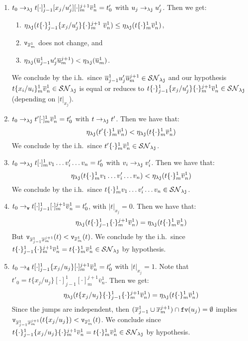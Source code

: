 \documentclass{LMCS}
\renewcommand{\>}{\rightarrow}
\def\lam{\lambda}
\newcommand{\Rew}[1]{\rightarrow_{#1}}
\newcommand{\isubs}[1]{ \{ #1  \} }
\newcommand{\SN}[1]{\mathcal{SN}_{#1}}
\newcommand{\ttv}{{\tt v}}
\newcommand{\dis}{{\tt j}}
\newcommand{\ldis}{\lam{\dis}}
\newcommand{\fv}[1]{{\tt fv}(#1)}
\newcommand{\Var}{{\tt d}}
\newcommand{\Gc}{{\tt w}}
\newcommand{\ems}{\emptyset}
\newcommand{\ih}{i.h.}
\newcommand{\fo}[2]{\ttv_{#2}(#1)}
\newcommand{\fop}[1]{\ttv_{#1}}
\renewcommand{\sp}[4]{\{#1_{i}/#2_{i}\}^{#3}_{#4}}
\newcommand{\ovl}[3]{\overline{#1}^{#2}_{#3}}
\newcommand{\jump}{jump}
\newcommand{\espp}[4]{[\cdot]^{#3}_{#4}}
\newcommand{\spp}[4]{\{\cdot\}^{#3}_{#4}}
\begin{document}
\begin{enumerate}[$\bullet$]
\item $t_0 \Rew{\ldis} t\espp{x}{u}{1}{j-1} [x_j/u'_j] \espp{x}{u}{j+1}{m} \ovl{v}{1}{n}= t'_0$ with $u_j \Rew{\ldis} u'_j$.  Then we get:
  \begin{enumerate}[$-$]
\item $\eta_{\ldis}(t\spp{x}{u}{1}{j-1}\isubs{x_j/u'_j}\spp{x}{u}{j+1}{m}\
 \ovl{v}{1}{n}) \leq \eta_{\ldis}(t\spp{x}{u}{1}{m} \ovl{v}{1}{n})$,
 \item $\fop{\ovl{x}{1}{m}}$ does not change, and
 \item $\eta_{\ldis}(\ovl{u}{1}{j-1} u'_j \ovl{u}{j+1}{m}) < \eta_{\ldis}(\ovl{u}{1}{m})$.
 \end{enumerate}
We conclude by the \ih\  since $\ovl{u}{1}{j-1} u'_j \ovl{u}{j+1}{m} \in \SN{\ldis}$ and  our hypothesis $t\sp{x}{u}{1}{m}\ovl{v}{1}{n}\in \SN{\ldis}$ is equal or reduces to $t\spp{x}{u}{1}{j-1}\isubs{x_j/u'_j}\spp{x}{u}{j+1}{m}\ovl{v}{1}{n} \in \SN{\ldis}$ (depending on $|t|_{x_j}$).


\item $t_0  \Rew{\ldis} t' \espp{x}{u}{1}{m} \ovl{v}{1}{n}= t'_0$ with $t \Rew{\ldis}
  t'$. Then we have that:
$$\eta_{\ldis}(t'\spp{x}{u}{1}{m} \ovl{v}{1}{n}) < 
\eta_{\ldis}(t\spp{x}{u}{1}{m} \ovl{v}{1}{n})$$
We conclude by the \ih\ since 
  $t'\spp{x}{u}{1}{m} \ovl{v}{1}{n} \in \SN{\ldis}$.


\item $t_0  \Rew{\ldis} t \espp{x}{u}{1}{m} v_1 \ldots  v'_i \ldots  v_n= t'_0$ with $v_i \Rew{\ldis}
  v'_i$.
 Then we have that:
$$\eta_{\ldis}(t\spp{x}{u}{1}{m} v_1 \ldots  v'_i \ldots  v_n) < 
\eta_{\ldis}(t\spp{x}{u}{1}{m} \ovl{v}{1}{n})$$
We conclude by the \ih\ since 
  $t\spp{x}{u}{1}{m} v_1 \ldots  v'_i \ldots  v_n \in \SN{\ldis}$.


\item $t_0 \Rew{\Gc} t\espp{x}{u}{1}{j-1} \espp{x}{u}{j+1}{m} \ovl{v}{1}{n}= t'_0$, with $|t|_{x_j}= 0$. Then we have that:
$$\eta_{\ldis}(t\spp{x}{u}{1}{j-1} \spp{x}{u}{j+1}{m} \ovl{v}{1}{n} )=
\eta_{\ldis}(t\spp{x}{u}{1}{m} \ovl{v}{1}{n})$$
But $\fo{t}{\ovl{x}{1}{j-1}\ovl{x}{j+1}{m}} <  \fo{t}{\ovl{x}{1}{m}}$.
We conclude by the \ih\ since 
$t\spp{x}{u}{1}{j-1}\spp{x}{u}{j+1}{m} \ovl{v}{1}{n} =  t\spp{x}{u}{1}{m} \ovl{v}{1}{n} \in \SN{\ldis}$
by hypothesis.

\item $t_0 \Rew{\Var} t  \espp{x}{u}{1}{j-1} \isubs{x_j/u_j} \espp{x}{u}{j+1}{m} \ovl{v}{1}{n} = t'_0$
with $|t|_{x_j} = 1$. Note that $t'_0= t \isubs{x_j/u_j}  \espp{x}{u}{1}{j-1} \espp{x}{u}{j+1}{m} \ovl{v}{1}{n}$.  Then we get:
$$\eta_{\ldis}(t\isubs{x_j/u_j}\spp{x}{u}{1}{j-1}\spp{x}{u}{j+1}{m} \ovl{v}{1}{n}) = 
\eta_{\ldis}(t\spp{x}{u}{1}{m} \ovl{v}{1}{n})$$
Since the \jump s
are independent, then $(\ovl{x}{1}{j-1} \cup  \ovl{x}{j+1}{m}) \cap \fv{u_j} = \ems$ implies
$\fo{t\isubs{x_j/u_j}}{\ovl{x}{1}{j-1}\ovl{x}{j+1}{m}} < \fo{t}{\ovl{x}{1}{m}}$.
   We conclude since $t\spp{x}{u}{1}{j-1}\isubs{x_j/u_j}\spp{x}{u}{j+1}{m} \ovl{v}{1}{n}=
t\spp{x}{u}{1}{m} \ovl{v}{1}{n} \in \SN{\ldis}$ by hypothesis.



\end{enumerate}
\end{document}

